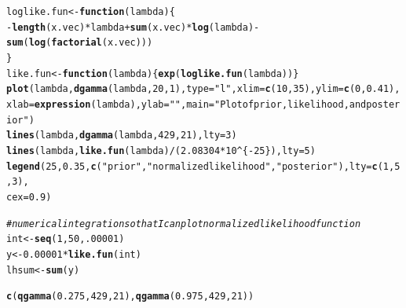 \documentclass[12pt]{article}\usepackage[]{graphicx}\usepackage[]{color}
\makeatletter
\newcommand{\hlnum}[1]{\textcolor[rgb]{0.686,0.059,0.569}{#1}}%
\newcommand{\hlstr}[1]{\textcolor[rgb]{0.192,0.494,0.8}{#1}}%
\newcommand{\hlcom}[1]{\textcolor[rgb]{0.678,0.584,0.686}{\textit{#1}}}%
\newcommand{\hlopt}[1]{\textcolor[rgb]{0,0,0}{#1}}%
\newcommand{\hlstd}[1]{\textcolor[rgb]{0.345,0.345,0.345}{#1}}%
\newcommand{\hlkwa}[1]{\textcolor[rgb]{0.161,0.373,0.58}{\textbf{#1}}}%
\newcommand{\hlkwb}[1]{\textcolor[rgb]{0.69,0.353,0.396}{#1}}%
\newcommand{\hlkwc}[1]{\textcolor[rgb]{0.333,0.667,0.333}{#1}}%
\newcommand{\hlkwd}[1]{\textcolor[rgb]{0.737,0.353,0.396}{\textbf{#1}}}%
\newenvironment{kframe}{%
 \def\at@end@of@kframe{}%
 \ifinner\ifhmode%
  \def\at@end@of@kframe{\end{minipage}}%
  \begin{minipage}{\columnwidth}%
 \fi\fi%
 \def\FrameCommand##1{\hskip\@totalleftmargin \hskip-\fboxsep
 \colorbox{shadecolor}{##1}\hskip-\fboxsep
     \hskip-\linewidth \hskip-\@totalleftmargin \hskip\columnwidth}%
 \MakeFramed {\advance\hsize-\width
   \@totalleftmargin\z@ \linewidth\hsize
   \@setminipage}}%
 {\par\unskip\endMakeFramed%
 \at@end@of@kframe}
\newenvironment{knitrout}{}{} %
\makeatother
\begin{document}
\begin{knitrout}\footnotesize
{}\color{fgcolor}\begin{kframe}
\begin{alltt}
\hlstd{loglike.fun} \hlkwb{<-} \hlkwa{function}\hlstd{(}\hlkwc{lambda}\hlstd{)\{}
  \hlopt{-}\hlkwd{length}\hlstd{(x.vec)}\hlopt{*}\hlstd{lambda}\hlopt{+}\hlkwd{sum}\hlstd{(x.vec)}\hlopt{*}\hlkwd{log}\hlstd{(lambda)}\hlopt{-}\hlkwd{sum}\hlstd{(}\hlkwd{log}\hlstd{(}\hlkwd{factorial}\hlstd{(x.vec)))}
\hlstd{\}}
\hlstd{like.fun} \hlkwb{<-} \hlkwa{function}\hlstd{(}\hlkwc{lambda}\hlstd{)\{}\hlkwd{exp}\hlstd{(}\hlkwd{loglike.fun}\hlstd{(lambda))\}}
\hlkwd{plot}\hlstd{(lambda,} \hlkwd{dgamma}\hlstd{(lambda,} \hlnum{20}\hlstd{,} \hlnum{1}\hlstd{),} \hlkwc{type}\hlstd{=}\hlstr{"l"}\hlstd{,} \hlkwc{xlim}\hlstd{=}\hlkwd{c}\hlstd{(}\hlnum{10}\hlstd{,}\hlnum{35}\hlstd{),} \hlkwc{ylim}\hlstd{=}\hlkwd{c}\hlstd{(}\hlnum{0}\hlstd{,} \hlnum{0.41}\hlstd{),} \hlkwc{xlab}\hlstd{=}\hlkwd{expression}\hlstd{(lambda),} \hlkwc{ylab}\hlstd{=}\hlstr{""}\hlstd{,} \hlkwc{main}\hlstd{=}\hlstr{"Plot of prior, likelihood, and posterior"}\hlstd{)}
\hlkwd{lines}\hlstd{(lambda,} \hlkwd{dgamma}\hlstd{(lambda,} \hlnum{429}\hlstd{,} \hlnum{21}\hlstd{),} \hlkwc{lty}\hlstd{=}\hlnum{3}\hlstd{)}
\hlkwd{lines}\hlstd{(lambda,} \hlkwd{like.fun}\hlstd{(lambda)}\hlopt{/}\hlstd{(}\hlnum{2.08304}\hlopt{*}\hlnum{10}\hlopt{^}\hlstd{\{}\hlopt{-}\hlnum{25}\hlstd{\}),} \hlkwc{lty}\hlstd{=}\hlnum{5}\hlstd{)}
\hlkwd{legend}\hlstd{(}\hlnum{25}\hlstd{,}\hlnum{0.35}\hlstd{,} \hlkwd{c}\hlstd{(}\hlstr{"prior"}\hlstd{,} \hlstr{"normalized likelihood"}\hlstd{,} \hlstr{"posterior"}\hlstd{),} \hlkwc{lty}\hlstd{=}\hlkwd{c}\hlstd{(}\hlnum{1}\hlstd{,}\hlnum{5}\hlstd{,}\hlnum{3}\hlstd{),}
       \hlkwc{cex}\hlstd{=}\hlnum{0.9}\hlstd{)}

\hlcom{#numerical integration so that I can plot normalized likelihood function}
\hlstd{int} \hlkwb{<-} \hlkwd{seq}\hlstd{(}\hlnum{1}\hlstd{,}\hlnum{50}\hlstd{,} \hlnum{.00001}\hlstd{)}
\hlstd{y} \hlkwb{<-} \hlnum{0.00001}\hlopt{*}\hlkwd{like.fun}\hlstd{(int)}
\hlstd{lhsum} \hlkwb{<-} \hlkwd{sum}\hlstd{(y)}
\end{alltt}
\end{kframe}
\end{knitrout}

\begin{knitrout}\footnotesize
{}\color{fgcolor}\begin{kframe}
\begin{alltt}
\hlkwd{c}\hlstd{(}\hlkwd{qgamma}\hlstd{(}\hlnum{0.275}\hlstd{,} \hlnum{429}\hlstd{,} \hlnum{21}\hlstd{),} \hlkwd{qgamma}\hlstd{(}\hlnum{0.975}\hlstd{,} \hlnum{429}\hlstd{,} \hlnum{21}\hlstd{))}
\end{alltt}
\end{kframe}
\end{knitrout}
\end{document}
